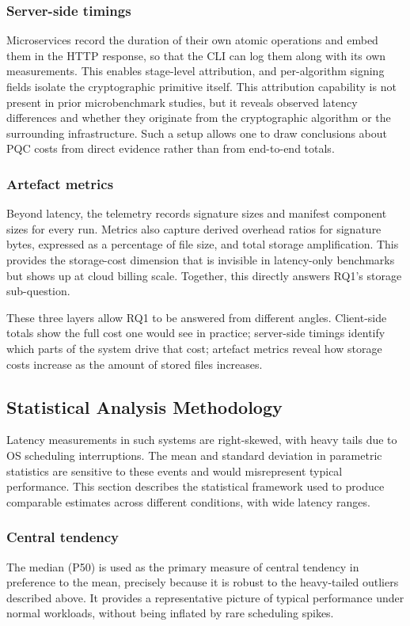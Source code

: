 \documentclass[12pt,a4paper]{article}
\begin{document}
\subsubsection{Server-side timings} Microservices record the duration of their own atomic operations and embed them in the HTTP response, so that the CLI can log them along with its own measurements. This enables stage-level attribution, and per-algorithm signing fields isolate the cryptographic primitive itself. This attribution capability is not present in prior microbenchmark studies, but it reveals observed latency differences and whether they originate from the cryptographic algorithm or the surrounding infrastructure. Such a setup allows one to draw conclusions about PQC costs from direct evidence rather than from end-to-end totals.

\subsubsection{Artefact metrics} Beyond latency, the telemetry records signature sizes and manifest component sizes for every run. Metrics also capture derived overhead ratios for signature bytes, expressed as a percentage of file size, and total storage amplification. This provides the storage-cost dimension that is invisible in latency-only benchmarks but shows up at cloud billing scale. Together, this directly answers RQ1's storage sub-question.

These three layers allow RQ1 to be answered from different angles. Client-side totals show the full cost one would see in practice; server-side timings identify which parts of the system drive that cost; artefact metrics reveal how storage costs increase as the amount of stored files increases.
\subsection{Statistical Analysis Methodology}
\label{sec:stats}

Latency measurements in such systems are right-skewed, with heavy tails due to OS scheduling interruptions. The mean and standard deviation in parametric statistics are sensitive to these events and would misrepresent typical performance. This section describes the statistical framework used to produce comparable estimates across different conditions, with wide latency ranges.

\subsubsection{Central tendency} The median (P50) is used as the primary measure of central tendency in preference to the mean, precisely because it is robust to the heavy-tailed outliers described above. It provides a representative picture of typical performance under normal workloads, without being inflated by rare scheduling spikes.
\end{document}
